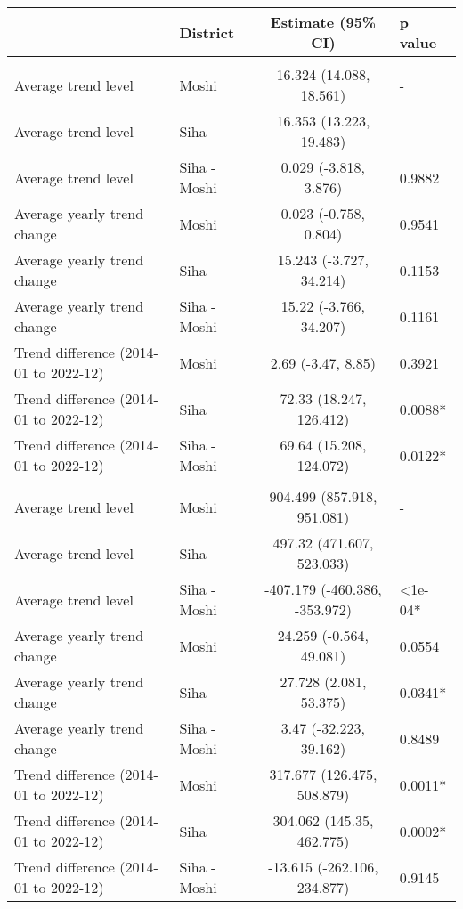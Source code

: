 \begingroup
\fontsize{12.0pt}{14.4pt}\selectfont
\begin{longtable}{l|lcl}
\toprule
 & District & Estimate (95\% CI) & p value \\ 
\midrule\addlinespace[2.5pt]
\multicolumn{4}{l}{Cancer} \\[2.5pt] 
\midrule\addlinespace[2.5pt]
Average trend level & Moshi & 16.324 (14.088, 18.561) & - \\ 
Average trend level & Siha & 16.353 (13.223, 19.483) & - \\ 
Average trend level & Siha - Moshi & 0.029 (-3.818, 3.876) & 0.9882 \\ 
Average yearly trend change & Moshi & 0.023 (-0.758, 0.804) & 0.9541 \\ 
Average yearly trend change & Siha & 15.243 (-3.727, 34.214) & 0.1153 \\ 
Average yearly trend change & Siha - Moshi & 15.22 (-3.766, 34.207) & 0.1161 \\ 
Trend difference (2014-01 to 2022-12) & Moshi & 2.69 (-3.47, 8.85) & 0.3921 \\ 
Trend difference (2014-01 to 2022-12) & Siha & 72.33 (18.247, 126.412) & 0.0088* \\ 
Trend difference (2014-01 to 2022-12) & Siha - Moshi & 69.64 (15.208, 124.072) & 0.0122* \\ 
\midrule\addlinespace[2.5pt]
\multicolumn{4}{l}{Cardiovascular Diseases} \\[2.5pt] 
\midrule\addlinespace[2.5pt]
Average trend level & Moshi & 904.499 (857.918, 951.081) & - \\ 
Average trend level & Siha & 497.32 (471.607, 523.033) & - \\ 
Average trend level & Siha - Moshi & -407.179 (-460.386, -353.972) & <1e-04* \\ 
Average yearly trend change & Moshi & 24.259 (-0.564, 49.081) & 0.0554 \\ 
Average yearly trend change & Siha & 27.728 (2.081, 53.375) & 0.0341* \\ 
Average yearly trend change & Siha - Moshi & 3.47 (-32.223, 39.162) & 0.8489 \\ 
Trend difference (2014-01 to 2022-12) & Moshi & 317.677 (126.475, 508.879) & 0.0011* \\ 
Trend difference (2014-01 to 2022-12) & Siha & 304.062 (145.35, 462.775) & 0.0002* \\ 
Trend difference (2014-01 to 2022-12) & Siha - Moshi & -13.615 (-262.106, 234.877) & 0.9145 \\ 

\end{longtable}
